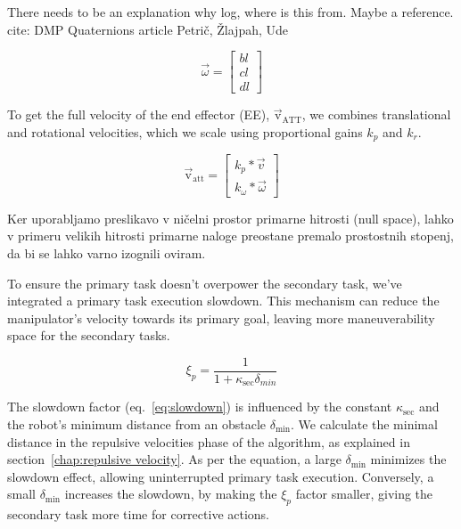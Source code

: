 \documentclass[letterpaper, 10 pt, conference]{ieeeconf}  %
\begin{document}
\alert{There needs to be an explanation why log, where is this from. Maybe a reference. cite: DMP Quaternions article Petrič, Žlajpah, Ude}



\begin{equation}
	\vec{\omega} =
	\begin{bmatrix}
		bl \\
		cl \\
		dl
	\end{bmatrix}
	\label{eq:rot_error_vector}
\end{equation}

To get the full velocity of the end effector (EE), \( \mathrm{\vec{v}_{ATT}} \), we combines translational and rotational velocities, which we scale using proportional gains \( k_p \) and \( k_r \).

\begin{equation}
	\mathrm{\vec{v}_{att}} = 
	\begin{bmatrix}
		k_p * \vec{v}   \\
		k_{\omega} * \vec{\omega}
	\end{bmatrix}
	\label{eq:ee_velocity}
\end{equation}

Ker uporabljamo preslikavo v ničelni prostor primarne hitrosti (null space), lahko v primeru velikih hitrosti primarne naloge preostane premalo prostostnih stopenj, da bi se lahko varno izognili oviram. 

\label{chap:primary slowdown}

To ensure the primary task doesn't overpower the secondary task, we've integrated a primary task execution slowdown. This mechanism can reduce the manipulator's velocity towards its primary goal, leaving more maneuverability space for the secondary tasks.

\begin{equation}
	\label{eq:slowdown}
	\xi_{p}=
	\frac{1}{1 + \kappa_{\text{sec}} \delta_{min}}
\end{equation}

The slowdown factor (eq.~\ref{eq:slowdown}) is influenced by the constant \( \kappa_{\text{sec}} \) and the robot's minimum distance from an obstacle \( \delta_{\text{min}} \). We calculate the minimal distance in the repulsive velocities phase of the algorithm, as explained in section~\ref{chap:repulsive velocity}. As per the equation, a large \( \delta_{\text{min}} \) minimizes the slowdown effect, allowing uninterrupted primary task execution. Conversely, a small \( \delta_{\text{min}} \) increases the slowdown, by making the $\xi_{p}$ factor smaller, giving the secondary task more time for corrective actions.
\end{document}
